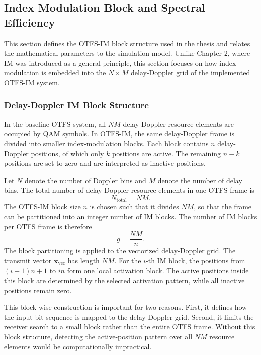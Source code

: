 \subsection{Index Modulation Block and Spectral Efficiency}

This section defines the OTFS-IM block structure used in the thesis and relates the mathematical parameters to the simulation model. Unlike Chapter 2, where IM was introduced as a general principle, this section focuses on how index modulation is embedded into the \(N \times M\) delay-Doppler grid of the implemented OTFS-IM system.

\subsubsection{Delay-Doppler IM Block Structure}

In the baseline OTFS system, all \(NM\) delay-Doppler resource elements are occupied by QAM symbols. In OTFS-IM, the same delay-Doppler frame is divided into smaller index-modulation blocks. Each block contains \(n\) delay-Doppler positions, of which only \(k\) positions are active. The remaining \(n-k\) positions are set to zero and are interpreted as inactive positions.

Let \(N\) denote the number of Doppler bins and \(M\) denote the number of delay bins. The total number of delay-Doppler resource elements in one OTFS frame is
\begin{equation}
    N_{\mathrm{total}} = NM .
\end{equation}
The OTFS-IM block size \(n\) is chosen such that it divides \(NM\), so that the frame can be partitioned into an integer number of IM blocks. The number of IM blocks per OTFS frame is therefore
\begin{equation}
    g = \frac{NM}{n}.
    \label{eq:otfs_im_num_blocks}
\end{equation}
The block partitioning is applied to the vectorized delay-Doppler grid. The transmit vector \(\mathbf{x}_{\mathrm{vec}}\) has length \(NM\). For the \(i\)-th IM block, the positions from \((i-1)n+1\) to \(in\) form one local activation block. The active positions inside this block are determined by the selected activation pattern, while all inactive positions remain zero.

This block-wise construction is important for two reasons. First, it defines how the input bit sequence is mapped to the delay-Doppler grid. Second, it limits the receiver search to a small block rather than the entire OTFS frame. Without this block structure, detecting the active-position pattern over all \(NM\) resource elements would be computationally impractical.


